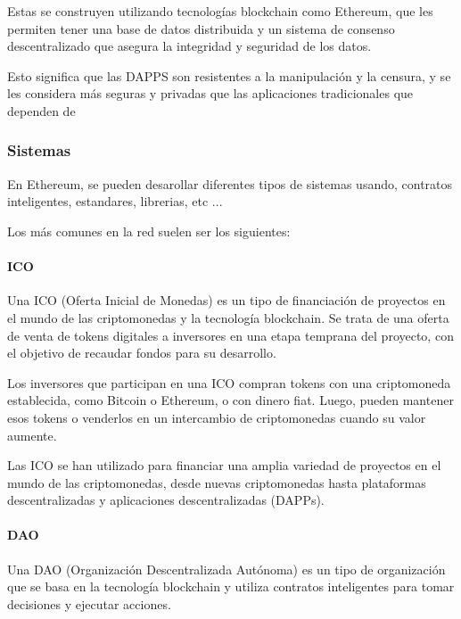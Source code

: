 \bigskip

Estas se construyen utilizando tecnologías blockchain como Ethereum, que les permiten tener una base de datos distribuida y un sistema de consenso descentralizado que asegura la integridad y seguridad de los datos.

\bigskip

Esto significa que las DAPPS son resistentes a la manipulación y la censura, y se les considera más seguras y privadas que las aplicaciones tradicionales que dependen de

\subsubsection{Sistemas}

En Ethereum, se pueden desarollar diferentes tipos de sistemas usando, contratos inteligentes, estandares, librerias, etc ...

\bigskip

Los más comunes en la red suelen ser los siguientes:

\paragraph{ICO}

Una ICO (Oferta Inicial de Monedas) es un tipo de financiación de proyectos en el mundo de las criptomonedas y la tecnología blockchain. Se trata de una oferta de venta de tokens digitales a inversores en una etapa temprana del proyecto, con el objetivo de recaudar fondos para su desarrollo.

\bigskip

Los inversores que participan en una ICO compran tokens con una criptomoneda establecida, como Bitcoin o Ethereum, o con dinero fiat. Luego, pueden mantener esos tokens o venderlos en un intercambio de criptomonedas cuando su valor aumente.

\bigskip

Las ICO se han utilizado para financiar una amplia variedad de proyectos en el mundo de las criptomonedas, desde nuevas criptomonedas hasta plataformas descentralizadas y aplicaciones descentralizadas (DAPPs).

\paragraph{DAO}

Una DAO (Organización Descentralizada Autónoma) es un tipo de organización que se basa en la tecnología blockchain y utiliza contratos inteligentes para tomar decisiones y ejecutar acciones.

